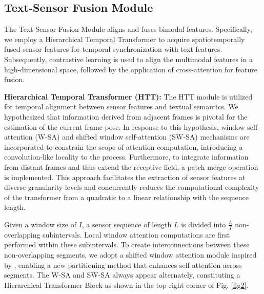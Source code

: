 \documentclass[letterpaper]{article} %
\begin{document}
\subsection{Text-Sensor Fusion Module}
The Text-Sensor Fusion Module aligns and fuses bimodal features.
Specifically, we employ a Hierarchical Temporal Transformer to acquire spatiotemporally fused sensor features for temporal synchronization with text features. Subsequently, contrastive learning is used to align the multimodal features in a high-dimensional space, followed by the application of cross-attention for feature fusion.

\textbf{Hierarchical Temporal Transformer (HTT):} The HTT module is utilized for temporal alignment between sensor features and textual semantics. We hypothesized that information derived from adjacent frames is pivotal for the estimation of the current frame pose. In response to this hypothesis, window self-attention (W-SA) and shifted window self-attention (SW-SA) mechanisms are incorporated to constrain the scope of attention computation, introducing a convolution-like locality to the process.
Furthermore, to integrate information from distant frames and thus extend the receptive field, a patch merge operation is implemented. This approach facilitates the extraction of sensor features at diverse granularity levels and concurrently reduces the computational complexity of the transformer from a quadratic to a linear relationship with the sequence length.

Given a window size of $I$, a sensor sequence of length $L$ is divided into $\frac{L}{I}$ non-overlapping subintervals. Local window attention computations are first performed within these subintervals. To create interconnections between these non-overlapping segments, we adopt a shifted window attention module inspired by \cite{liu2021swin}, enabling a new partitioning method that enhances self-attention across segments. The W-SA and SW-SA always appear alternately, constituting a Hierarchical Transformer Block as shown in the top-right corner of Fig. \ref{fig2}.
\end{document}
